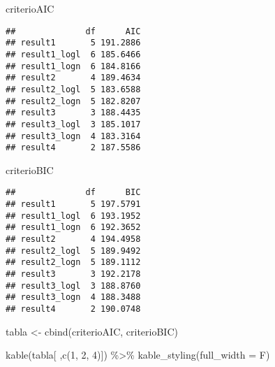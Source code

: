 \documentclass[
]{article}
\newenvironment{Shaded}{\begin{snugshade}}{\end{snugshade}}
\newcommand{\AttributeTok}[1]{\textcolor[rgb]{0.77,0.63,0.00}{#1}}
\newcommand{\DecValTok}[1]{\textcolor[rgb]{0.00,0.00,0.81}{#1}}
\newcommand{\FunctionTok}[1]{\textcolor[rgb]{0.00,0.00,0.00}{#1}}
\newcommand{\NormalTok}[1]{#1}
\newcommand{\OtherTok}[1]{\textcolor[rgb]{0.56,0.35,0.01}{#1}}
\newcommand{\SpecialCharTok}[1]{\textcolor[rgb]{0.00,0.00,0.00}{#1}}
\begin{document}
\begin{Shaded}
\begin{Highlighting}[]
\NormalTok{criterioAIC}
\end{Highlighting}
\end{Shaded}

\begin{verbatim}
##              df      AIC
## result1       5 191.2886
## result1_logl  6 185.6466
## result1_logn  6 184.8166
## result2       4 189.4634
## result2_logl  5 183.6588
## result2_logn  5 182.8207
## result3       3 188.4435
## result3_logl  3 185.1017
## result3_logn  4 183.3164
## result4       2 187.5586
\end{verbatim}

\begin{Shaded}
\begin{Highlighting}[]
\NormalTok{criterioBIC}
\end{Highlighting}
\end{Shaded}

\begin{verbatim}
##              df      BIC
## result1       5 197.5791
## result1_logl  6 193.1952
## result1_logn  6 192.3652
## result2       4 194.4958
## result2_logl  5 189.9492
## result2_logn  5 189.1112
## result3       3 192.2178
## result3_logl  3 188.8760
## result3_logn  4 188.3488
## result4       2 190.0748
\end{verbatim}

\begin{Shaded}
\begin{Highlighting}[]
\NormalTok{tabla }\OtherTok{\textless{}{-}} \FunctionTok{cbind}\NormalTok{(criterioAIC, criterioBIC)}

\FunctionTok{kable}\NormalTok{(tabla[ ,}\FunctionTok{c}\NormalTok{(}\DecValTok{1}\NormalTok{, }\DecValTok{2}\NormalTok{, }\DecValTok{4}\NormalTok{)]) }\SpecialCharTok{\%\textgreater{}\%}
  \FunctionTok{kable\_styling}\NormalTok{(}\AttributeTok{full\_width =}\NormalTok{ F)}
\end{Highlighting}
\end{Shaded}
\end{document}
